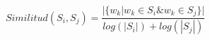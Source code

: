 \documentclass[12pt]{standalone}
\begin{document}
   \begin{varwidth}{75in}
      \begin{displaymath}
        Similitud(S_{i},S_{j}) = \frac{ | \{   w_{k} | w_{k} \in S_{i} \& w_{k} \in S_{j}   \}  | }    
                                      {  log(|S_{i}|) + log(|S_{j}|)  }
      \end{displaymath}

    \end{varwidth}
\end{document}
